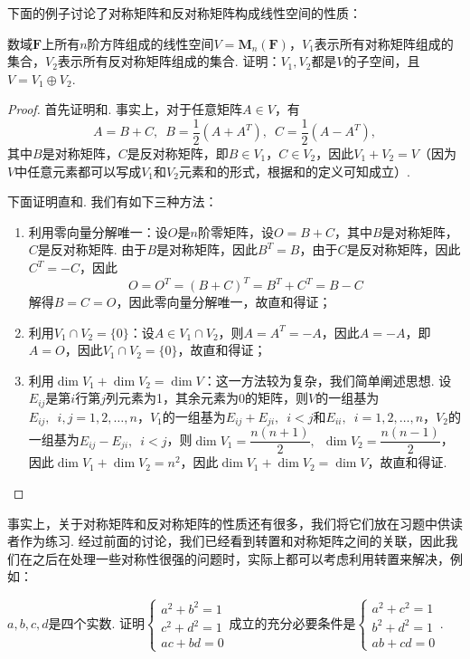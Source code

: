 下面的例子讨论了对称矩阵和反对称矩阵构成线性空间的性质：
\begin{example}{}{}
    数域$\mathbf{F}$上所有$n$阶方阵组成的线性空间$V=\mathbf{M}_n(\mathbf{F})$，$V_1$表示所有对称矩阵组成的集合，$V_2$表示所有反对称矩阵组成的集合. 证明：$V_1,V_2$都是$V$的子空间，且$V=V_1\oplus V_2$.
\end{example}

\begin{proof}
    首先证明和. 事实上，对于任意矩阵$A\in V$，有
    \[A=B+C,\enspace B=\frac{1}{2}(A+A^T),\enspace C=\frac{1}{2}(A-A^T),\]
    其中$B$是对称矩阵，$C$是反对称矩阵，即$B\in V_1$，$C\in V_2$，因此$V_1+V_2=V$（因为$V$中任意元素都可以写成$V_1$和$V_2$元素和的形式，根据和的定义可知成立）.

    下面证明直和. 我们有如下三种方法：
    \begin{enumerate}
        \item 利用零向量分解唯一：设$O$是$n$阶零矩阵，设$O=B+C$，其中$B$是对称矩阵，$C$是反对称矩阵. 由于$B$是对称矩阵，因此$B^T=B$，由于$C$是反对称矩阵，因此$C^T=-C$，因此
              \[O=O^T=(B+C)^T=B^T+C^T=B-C\]
              解得$B=C=O$，因此零向量分解唯一，故直和得证；

        \item 利用$V_1\cap V_2=\{0\}$：设$A\in V_1\cap V_2$，则$A=A^T=-A$，因此$A=-A$，即$A=O$，因此$V_1\cap V_2=\{0\}$，故直和得证；

        \item 利用$\dim V_1+\dim V_2=\dim V$：这一方法较为复杂，我们简单阐述思想. 设$E_{ij}$是第$i$行第$j$列元素为1，其余元素为0的矩阵，则$V$的一组基为$E_{ij},\enspace i,j=1,2,\ldots,n$，$V_1$的一组基为$E_{ij}+E_{ji},\enspace i<j$和$E_{ii},\enspace i=1,2,\ldots,n$，$V_2$的一组基为$E_{ij}-E_{ji},\enspace i<j$，则$\dim V_1=\dfrac{n(n+1)}{2},\enspace \dim V_2=\dfrac{n(n-1)}{2}$，因此$\dim V_1+\dim V_2=n^2$，因此$\dim V_1+\dim V_2=\dim V$，故直和得证.
    \end{enumerate}
\end{proof}

事实上，关于对称矩阵和反对称矩阵的性质还有很多，我们将它们放在习题中供读者作为练习. 经过前面的讨论，我们已经看到转置和对称矩阵之间的关联，因此我们在之后在处理一些对称性很强的问题时，实际上都可以考虑利用转置来解决，例如：
\begin{example}{}{}
    $a,b,c,d$是四个实数. 证明$\begin{cases}
            a^2+b^2=1 \\
            c^2+d^2=1 \\
            ac+bd=0
        \end{cases}$成立的充分必要条件是$\begin{cases}
            a^2+c^2=1 \\
            b^2+d^2=1 \\
            ab+cd=0
        \end{cases}$.
\end{example}

